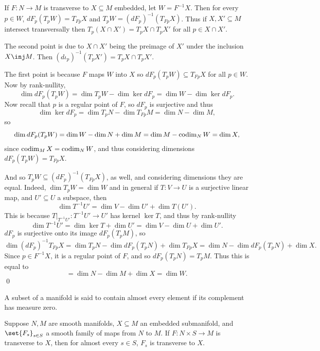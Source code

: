     If $F\colon N\to M$ is transverse to $X\subseteq M$ embedded, let $W=F^{-1}X$.
    Then for every $p\in W$, $dF_p(T_pW)=T_{Fp}X$ and $T_pW=(dF_p)^{-1}(T_{Fp}X)$.
    Thus if $X,X'\subseteq M$ intersect transversally then $T_p(X\cap X')=T_pX\cap T_pX'$ for all $p\in X\cap X'$.

\elemm

\bproof

    The second point is due to $X\cap X'$ being the preimage of $X'$ under the inclusion $X\inj M$.
    Then $(d\iota_p)^{-1}(T_pX')=T_pX\cap T_pX'$.

    The first point is because $F$ maps $W$ into $X$ so $dF_p(T_pW)\subseteq T_{Fp}X$ for all $p\in W$.
    Now by rank-nullity,
    $$ \dim dF_p(T_pW) = \dim T_pW - \dim\ker dF_p = \dim W - \dim\ker dF_p . $$
    Now recall that $p$ is a regular point of $F$, so $dF_p$ is surjective and thus
    $$ \dim\ker dF_p = \dim T_pN - \dim T_{Fp}M = \dim N - \dim M , $$
    so
    $$ \dim dF_p(T_pW) = \dim W - \dim N + \dim M = \dim M - \mathop{\rm codim}\nolimits_NW = \dim X , $$
    since $\mathop{\rm codim}\nolimits_MX=\mathop{\rm codim}\nolimits_NW$, and thus considering dimensions $dF_p(T_pW)=T_{Fp}X$.

    And so $T_pW\subseteq(dF_p)^{-1}(T_{Fp}X)$, as well, and considering dimensions they are equal.
    Indeed, $\dim T_pW=\dim W$ and in general if $T\colon V\to U$ is a surjective linear map, and $U'\subseteq U$ a subspace,
    then
    $$ \dim T^{-1}U' = \dim V - \dim U' + \dim T(U') . $$
    This is because $T|_{T^{-1}U'}\colon T^{-1}U'\to U'$ has kernel $\ker T$, and thus by rank-nullity
    $$ \dim T^{-1}U' = \dim\ker T + \dim U' = \dim V - \dim U + \dim U' . $$
    $dF_p$ is surjective onto its image $dF_p(T_pM)$, so
    $$ \dim(dF_p)^{-1}T_{Fp}X = \dim T_pN - \dim dF_p(T_pN) + \dim T_{Fp}X = \dim N - \dim dF_p(T_pN) + \dim X . $$
    Since $p\in F^{-1}X$, it is a regular point of $F$, and so $dF_p(T_pN)=T_pM$.
    Thus this is equal to
    $$ = \dim N - \dim M + \dim X = \dim W . $$
    \qed

\eproof

\bdefn

    A subset of a manifold is said to contain {\emphcolor almost every element} if its complement has measure zero.

\edefn

\bthrm[title=Parametric transversality]

    Suppose $N,M$ are smooth manifolds, $X\subseteq M$ an embedded submanifold, and $\set{F_s}_{s\in S}$
    a smooth family of maps from $N$ to $M$.
    If $F\colon N\times S\to M$ is transverse to $X$, then for almost every $s\in S$, $F_s$ is transverse to $X$.

